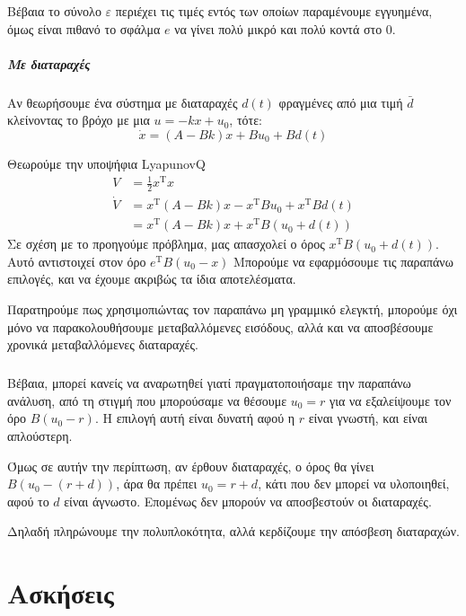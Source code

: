 \documentclass[11pt,a4paper,notitlepage,fleqn]{article}
\begin{document}
Βέβαια το σύνολο \( \varepsilon \) περιέχει τις τιμές εντός των οποίων παραμένουμε εγγυημένα, όμως είναι πιθανό το σφάλμα \( e \) να γίνει πολύ μικρό και πολύ κοντά στο 0.

\subparagraph{Με διαταραχές}
Αν θεωρήσουμε ένα σύστημα με διαταραχές \( d(t) \) φραγμένες από μια τιμή \( \bar d \) κλείνοντας το βρόχο με μια \( u = -kx + u_0  \), τότε:
\[
\dot x = (A-Bk) x + Bu_0 + Bd(t)
\]

Θεωρούμε την υποψήφια LyapunovQ
\begin{align*}
	V &= \frac{1}{2} x^{\mathrm T} x
	\\
	\dot{V} &= x^{\mathrm T} (A-Bk) x - x^{\mathrm T} B u_0
	+ x^{\mathrm T} B d(t)
	\\ &= x^{\mathrm T}(A-Bk)x + x^{\mathrm T} B (u_0 + d(t))
\end{align*}
Σε σχέση με το προηγούμε πρόβλημα, μας απασχολεί ο όρος \( x^{\mathrm T}B\left(u_0 + d(t)\right) \).
Αυτό αντιστοιχεί στον όρο \( e^{\mathrm T}B(u_0 - x) \)
Μπορούμε να εφαρμόσουμε τις παραπάνω επιλογές, και να έχουμε ακριβώς τα ίδια αποτελέσματα.

Παρατηρούμε πως χρησιμοπιώντας τον παραπάνω μη γραμμικό ελεγκτή, μπορούμε όχι μόνο να παρακολουθήσουμε μεταβαλλόμενες εισόδους, αλλά και να αποσβέσουμε χρονικά μεταβαλλόμενες διαταραχές.

\subparagraph{}
Βέβαια, μπορεί κανείς να αναρωτηθεί γιατί πραγματοποιήσαμε την παραπάνω ανάλυση, από τη στιγμή που μπορούσαμε να θέσουμε \( u_0 = r \) για να εξαλείψουμε τον όρο \( B(u_0 - r) \). Η επιλογή αυτή είναι δυνατή αφού η
\( r \) είναι γνωστή, και είναι απλούστερη.

Όμως σε αυτήν την περίπτωση, αν έρθουν διαταραχές, ο όρος θα γίνει
\( B\left(u_0 - (r+d)\right) \), άρα θα πρέπει \( u_0 = r + d \), κάτι
που δεν μπορεί να υλοποιηθεί, αφού το \( d \) είναι άγνωστο. Επομένως δεν
μπορούν να αποσβεστούν οι διαταραχές.

Δηλαδή πληρώνουμε την πολυπλοκότητα, αλλά κερδίζουμε την απόσβεση διαταραχών.


\section{Ασκήσεις}
\end{document}
